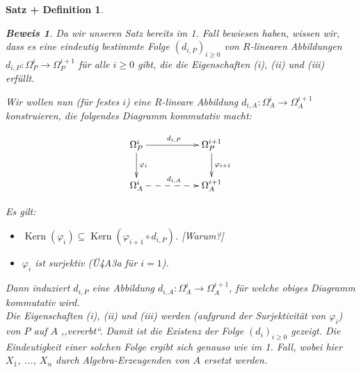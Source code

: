 \documentclass[a4paper,12pt]{scrbook}
\theoremstyle{break}
\newtheorem{SatzDef}[Satz]{Satz + Definition}
\theoremstyle{nonumberbreak}
\newtheorem{Bew}{Beweis}
\theoremstyle{nonumberplain}
\DeclareMathOperator{\Kern}{Kern}
\begin{document}
\begin{SatzDef}
\begin{Bew}
Da wir unseren Satz bereits im 1. Fall bewiesen haben, wissen wir, dass es eine eindeutig bestimmte Folge $\left(d_{i,P}\right)_{i\geq 0}$ von $R$-linearen Abbildungen $d_{i,P} : \Omega^i_P \rightarrow \Omega^{i+1}_P$ für alle $i \geq 0$ gibt, die die Eigenschaften (i), (ii) und (iii) erfüllt.

Wir wollen nun (für festes $i$) eine $R$-lineare Abbildung $d_{i,A}: \Omega_A^{i}\to \Omega_A^{i+1}$ konstruieren, die folgendes Diagramm kommutativ macht:

\[
\begin{xy}
\xymatrix{
\Omega_P^i\ar[rr]^{d_{i,P}}\ar[d]^{\varphi_i}&&\Omega_P^{i+1}\ar[d]^{\varphi_{i+1}}\\
\Omega_A^i\ar@{-->}[rr]^{d_{i,A}}&&\Omega_A^{i+1}\\
}
\end{xy}
\]

Es gilt: 
\begin{itemize}
\item $\Kern(\varphi_i)\subseteq \Kern(\varphi_{i+1}\circ d_{i,P})$. [Warum?]
\item $\varphi_i$ ist surjektiv (Ü4A3a für $i=1$).
\end{itemize}

Dann induziert $d_{i,P}$ eine Abbildung $d_{i,A}: \Omega_A^{i}\to \Omega_A^{i+1}$, für welche obiges Diagramm kommutativ wird.\\
Die Eigenschaften (i), (ii) und (iii) werden (aufgrund der Surjektivität von $\varphi_i$) von $P$ auf $A$ ,,vererbt``. Damit ist die Existenz der Folge $\left(d_i\right)_{i\geq 0}$ gezeigt. Die Eindeutigkeit einer solchen Folge ergibt sich genauso wie im 1. Fall, wobei hier $X_1$, ..., $X_n$ durch Algebra-Erzeugenden von $A$ ersetzt werden.

\end{Bew}
\end{SatzDef}
\end{document}
